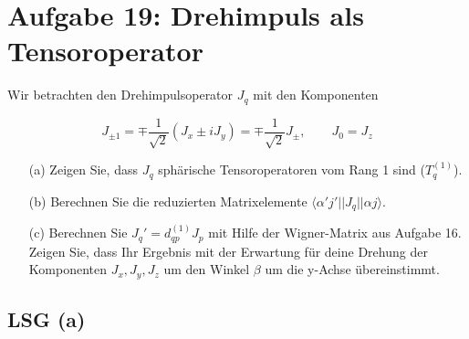 


\section*{Aufgabe 19: Drehimpuls als Tensoroperator}

Wir betrachten den Drehimpulsoperator \(J_q\) mit den Komponenten

\[J_{\pm 1}=\mp \frac{1}{\sqrt{2}}(J_x\pm iJ_y) = \mp\frac{1}{\sqrt{2}}J_{\pm},\qquad J_0=J_z\]

\begin{enumerate}
\item[(a)] Zeigen Sie, dass \(J_q\) sphärische Tensoroperatoren vom Rang 1 sind (\(T^{(1)}_q\)).
\item[(b)] Berechnen Sie die reduzierten Matrixelemente \(\langle \alpha' j'||J_q||\alpha j\rangle \).
\item[(c)] Berechnen Sie \(J_q' = d^{(1)}_{qp}J_p\) mit Hilfe der Wigner-Matrix aus Aufgabe 16. Zeigen Sie, dass Ihr Ergebnis mit der Erwartung für deine Drehung der Komponenten \(J_x,J_y,J_z\) um den Winkel \(\beta\) um die y-Achse übereinstimmt.
\end{enumerate}


\subsection*{LSG (a)}






